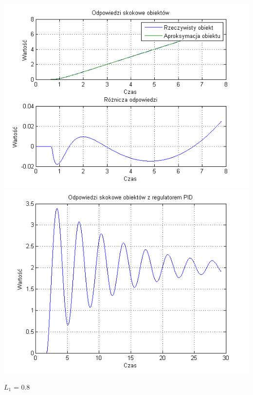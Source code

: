 \documentclass[10pt,a4paper]{article}
\begin{document}
\begin{center}
\includegraphics[scale=1]{images/dwa/skrypt_147.png}\\
\includegraphics[scale=1]{images/dwa/skrypt_148.png}\\
\end{center}
\newpage
$L_1$ = 0.8
\end{document}
